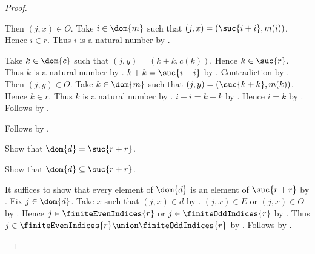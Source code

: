 \begin{proof}
\begin{subproof}
\begin{subproof}
\begin{byCase}
                Then $(j,x)\in O$.
                Take $i\in\dom{m}$ such that
                    $(j,x)=(\suc{i+i},m(i))$.
                Hence $i\in r$.
                Thus $i$ is a natural number
                    by .
                \begin{byCase}
                    Take $k\in\dom{c}$ such that
                        $(j,y)=(k+k,c(k))$.
                    Hence $k\in\suc{r}$.
                    Thus $k$ is a natural number
                        by .
                    $k+k=\suc{i+i}$ by .
                    Contradiction by .
                    Then $(j,y)\in O$.
                    Take $k\in\dom{m}$ such that
                        $(j,y)=(\suc{k+k},m(k))$.
                    Hence $k\in r$.
                    Thus $k$ is a natural number
                        by .
                    $i+i=k+k$ by .
                    Hence $i=k$ by .
                    Follows by .
                \end{byCase}
            \end{byCase}
        \end{subproof}
        Follows by .
    \end{subproof}
    Show that $\dom{d}=\suc{r+r}$.
    \begin{subproof}
        Show that $\dom{d}\subseteq\suc{r+r}$.
        \begin{subproof}
            It suffices to show that every element of $\dom{d}$ is an element
                of $\suc{r+r}$ by .
            Fix $j\in\dom{d}$.
            Take $x$ such that $(j,x)\in d$ by .
            $(j,x)\in E$ or $(j,x)\in O$ by .
            Hence $j\in\finiteEvenIndices{r}$ or
                $j\in\finiteOddIndices{r}$
                by .
            Thus $j\in\finiteEvenIndices{r}\union\finiteOddIndices{r}$
                by .
            Follows by .
        \end{subproof}

\end{subproof}
\end{proof}
